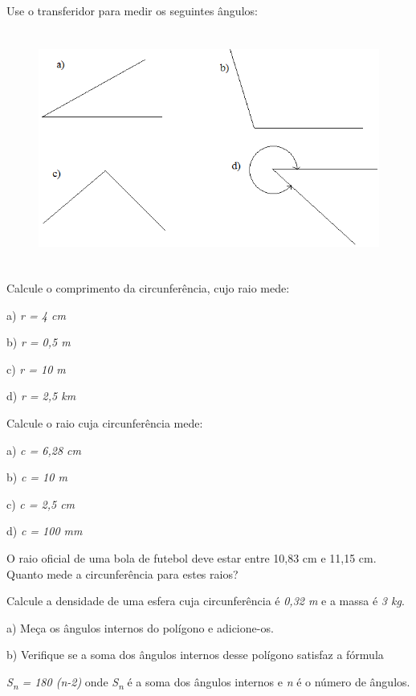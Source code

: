 \begin{exercicios}
\exitem{} Use o transferidor para medir os seguintes ângulos:

\begin{figure}[H]
    \begin{Center}
        \includegraphics[width=5.24in,height=3.05in]{capitulos/trigonometria_e_funcoes_trigonometricas/media/image6.png}
    \end{Center}
\end{figure}

\exitem{} Calcule o comprimento da circunferência, cujo raio mede:

a) \textit{r = 4 cm}

b) \textit{r = 0,5 m}

c) \textit{r = 10 m}

d) \textit{r = 2,5 km}

\exitem{} Calcule o raio cuja circunferência mede:

a) \textit{c = 6,28 cm}

b) \textit{c = 10 m}

c) \textit{c = 2,5 cm}

d) \textit{c = 100 mm}

\exitem{} O raio oficial de uma bola de futebol deve estar entre 10,83 cm e 11,15 cm. Quanto mede a circunferência para estes raios?

\exitem{} Calcule a densidade de uma esfera cuja circunferência é \textit{0,32 m} e a massa é \textit{3 kg}.

\exitem{} a) Meça os ângulos internos do polígono e adicione-os.

b) Verifique se a soma dos ângulos internos desse polígono satisfaz a fórmula

\textit{S\textsubscript{n} = 180 (n-2) }onde \textit{S\textsubscript{n}} é a soma dos ângulos internos e \textit{n} é o número de ângulos.


\end{exercicios}
